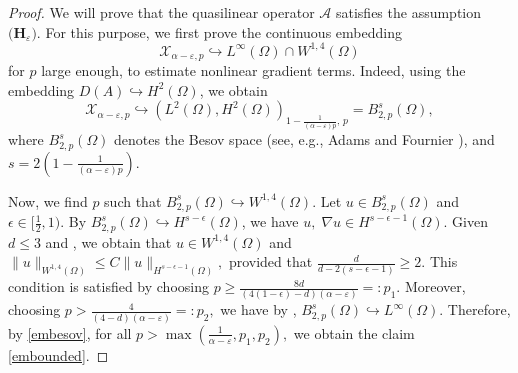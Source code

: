 \documentclass[reqno]{amsart}
\numberwithin{equation}{section}
\begin{document}
\begin{proof}
We will prove that the quasilinear operator $\mathcal{A}$ satisfies the assumption $\textbf{(H$_\varepsilon$)}.$ For this purpose, we first prove the continuous embedding 
\begin{equation}\label{embounded}
    \mathcal{X}_{\alpha-\varepsilon,p}\hookrightarrow L^{\infty}(\Omega)\cap W^{1,4}(\Omega)
\end{equation}
for $p$ large enough, to estimate nonlinear gradient terms. Indeed, using the embedding $D(A)\hookrightarrow H^2(\Omega)$, we obtain 
\begin{equation}\label{embesov}
    \mathcal{X}_{\alpha-\varepsilon,p}\hookrightarrow (L^2(\Omega), H^2(\Omega))_{1-\frac{1}{(\alpha-\varepsilon) p},\,p}=B_{2,p}^{s}(\Omega),
\end{equation}
where $B_{2,p}^{s}(\Omega)$ denotes the Besov space (see, e.g., Adams and Fournier \cite[\S 7.30]{AF03}), and $s=2\left(1-\frac{1}{(\alpha-\varepsilon) p}\right)$.

Now, we find $p$ such that $B_{2,p}^{s}(\Omega)\hookrightarrow W^{1,4}(\Omega)$. Let $u\in B_{2,p}^{s}(\Omega)$ and $\epsilon\in [\frac{1}{2},1)$. By $B_{2,p}^{s}(\Omega)\hookrightarrow H^{s-\epsilon}(\Omega)$, we have $u,\;\nabla u\in H^{s-\epsilon-1}(\Omega)$.
Given $d\leq 3$ and \cite[Theorem 6.7]{DiN12}, we obtain that $u\in W^{1,4}(\Omega)$ and $\|u\|_{W^{1,4}(\Omega)}\le C\|u\|_{H^{s-\epsilon-1}(\Omega)},$ provided that $\frac{d}{d-2(s-\epsilon-1)} \ge 2.$ This condition is satisfied by choosing $p\ge \frac{8d}{(4(1-\epsilon)-d)(\alpha-\varepsilon)}=:p_1.$ Moreover, choosing $p>\frac{4}{(4-d)(\alpha-\varepsilon)}=:p_2,$ we have by \cite[Theorem 4.6.1, p.327]{Tr78}, $B_{2,p}^{s}(\Omega)\hookrightarrow L^\infty(\Omega).$ Therefore, by \eqref{embesov}, for all $p>\max(\frac{1}{\alpha-\varepsilon},p_1,p_2),$ we obtain the claim \eqref{embounded}.


\end{proof}
\end{document}
